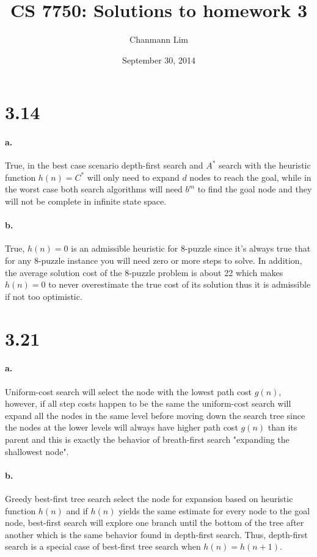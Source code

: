 \documentclass[a4paper]{article}
\begin{document}
\title{CS 7750: Solutions to homework 3}
\author{Chanmann Lim}
\date{September 30, 2014}
\maketitle

\section*{3.14}

\paragraph{a.} True, in the best case scenario depth-first search and $A^{*}$ search with the heuristic function $h(n) = C^{*}$ will only need to expand $d$ nodes to reach the goal, while in the worst case both search algorithms will need $b^{m}$ to find the goal node and they will not be complete in infinite state space.

\paragraph{b.} True, $h(n) = 0$ is an admissible heuristic for 8-puzzle since it's always true that for any 8-puzzle instance you will need zero or more steps to solve. In addition, the average solution cost of the 8-puzzle problem is about 22 which makes $h(n) = 0$ to never overestimate the true cost of its solution thus it is admissible if not too optimistic. 

\section*{3.21}

\paragraph{a.} Uniform-cost search will select the node with the lowest path cost $g(n)$, however, if all step costs happen to be the same the uniform-cost search will expand all the nodes in the same level before moving down the search tree since the nodes at the lower levels will always have higher path cost $g(n)$ than its parent and this is exactly the behavior of breath-first search  "expanding the shallowest node".

\paragraph{b.} Greedy best-first tree search select the node for expansion based on heuristic function $h(n)$ and if $h(n)$ yields the same estimate for every node to the goal node, best-first search will explore one branch until the bottom of the tree after another which is the same behavior found in depth-first search. Thus, depth-first search is a special case of best-first tree search when $h(n) = h(n+1)$.
\end{document}
